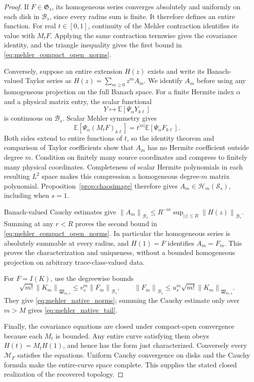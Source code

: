 \documentclass[11pt,a4paper]{amsart}
\numberwithin{equation}{section}
\theoremstyle{definition}
\theoremstyle{remark}
\newcommand{\E}{\mathbb E}
\newcommand{\Sch}{\mathcal S}
\newcommand{\Wc}{\mathfrak W}
\newcommand{\Gaus}{\mathfrak G}
\newcommand{\norm}[1]{\left\lVert#1\right\rVert}
\begin{document}
\begin{proof}
If $F\in\Gaus_s$, its homogeneous series converges absolutely and uniformly on each disk in $\mathscr B_s$, since every radius sum is finite. It therefore defines an entire function. For real $t\in[0,1]$, continuity of the Mehler contraction identifies its value with $M_tF$. Applying the same contraction termwise gives the covariance identity, and the triangle inequality gives the first bound in \eqref{eq:mehler_compact_open_norms}.

Conversely, suppose an entire extension $H(z)$ exists and write its Banach-valued Taylor series as $H(z)=\sum_{m\ge0}z^mA_m$. We identify $A_m$ before using any homogeneous projection on the full Banach space. For a finite Hermite index $\alpha$ and a physical matrix entry, the scalar functional
\[
 Y\longmapsto\E[\Psi_\alpha Y_{k\ell}]
\]
is continuous on $\mathscr B_s$. Scalar Mehler symmetry gives
\[
 \E[\Psi_\alpha(M_tF)_{k\ell}]
   =t^{|\alpha|}\E[\Psi_\alpha F_{k\ell}].
\]
Both sides extend to entire functions of $t$, so the identity theorem and comparison of Taylor coefficients show that $A_m$ has no Hermite coefficient outside degree $m$. Condition on finitely many source coordinates and compress to finitely many physical coordinates. Completeness of scalar Hermite polynomials in each resulting $L^2$ space makes this compression a homogeneous degree-$m$ matrix polynomial. Proposition~\ref{prop:chaosimage} therefore gives $A_m\in\mathcal H_m(\Sch_s)$, including when $s=1$.

Banach-valued Cauchy estimates give $\norm{A_m}_{\mathscr B_s}\le R^{-m}\sup_{|z|\le R}\norm{H(z)}_{\mathscr B_s}$. Summing at any $r<R$ proves the second bound in \eqref{eq:mehler_compact_open_norms}. In particular the homogeneous series is absolutely summable at every radius, and $H(1)=F$ identifies $A_m=F_m$. This proves the characterization and uniqueness, without a bounded homogeneous projection on arbitrary trace-class-valued data.

For $F=I(K)$, use the degreewise bounds
\[
 \sqrt{m!}\norm{K_m}_{\Wc_{m,s}}
 \le v_s^m\norm{F_m}_{\mathscr B_s},
 \qquad
 \norm{F_m}_{\mathscr B_s}
 \le u_s^m\sqrt{m!}\norm{K_m}_{\Wc_{m,s}}.
\]
They give \eqref{eq:mehler_native_norms}; summing the Cauchy estimate only over $m>M$ gives \eqref{eq:mehler_native_tail}.

Finally, the covariance equations are closed under compact-open convergence because each $M_t$ is bounded. Any entire curve satisfying them obeys $H(t)=M_tH(1)$, and hence has the form just characterized. Conversely every $\mathscr M_F$ satisfies the equations. Uniform Cauchy convergence on disks and the Cauchy formula make the entire-curve space complete. This supplies the stated closed realization of the recovered topology.
\end{proof}
\end{document}
